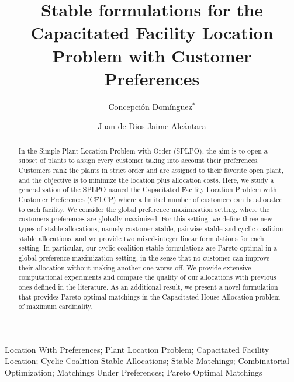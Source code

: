 \documentclass[preprint,11pt,authoryear]{elsarticle}
\begin{document}
\newlength{\medidaparentesis}
\settowidth{\medidaparentesis}{(00)}

\begin{frontmatter}
\title{Stable formulations for the Capacitated Facility Location Problem with Customer Preferences}


\author[um]{Concepci\'on Dom\'inguez$^*$}
\author[um]{Juan de Dios Jaime-Alcántara}
\address[um]{Department of Statistics and Operations Research, University of Murcia, Murcia 30100, Spain }






\allowdisplaybreaks

\begin{abstract} 
In the Simple Plant Location Problem with Order (SPLPO), the aim is to open a subset of plants to assign every customer taking into account their preferences. Customers rank the plants in strict order and are assigned to their favorite open plant, and the objective is to minimize the location plus allocation costs. Here, we study a generalization of the SPLPO named the Capacitated Facility Location Problem with Customer Preferences (CFLCP) where a limited number of customers can be allocated to each facility. We consider the global preference maximization setting, where the customers preferences are globally maximized. For this setting, we define three new types of stable allocations, namely customer stable, pairwise stable and cyclic-coalition stable allocations, and we provide two mixed-integer linear formulations for each setting. In particular, our cyclic-coalition stable formulations are Pareto optimal in a global-preference maximization setting, in the sense that no customer can improve their allocation without making another one worse off. We provide extensive computational experiments and compare the quality of our allocations with previous ones defined in the literature. As an additional result, we present a novel formulation that provides Pareto optimal matchings in the Capacitated House Allocation problem of maximum cardinality.

\end{abstract}
	
\begin{keyword}
Location With Preferences; Plant Location Problem; Capacitated Facility Location; Cyclic-Coalition Stable Allocations; Stable Matchings; Combinatorial Optimization; Matchings Under Preferences; Pareto Optimal Matchings
\end{keyword}

\end{frontmatter}
\end{document}
